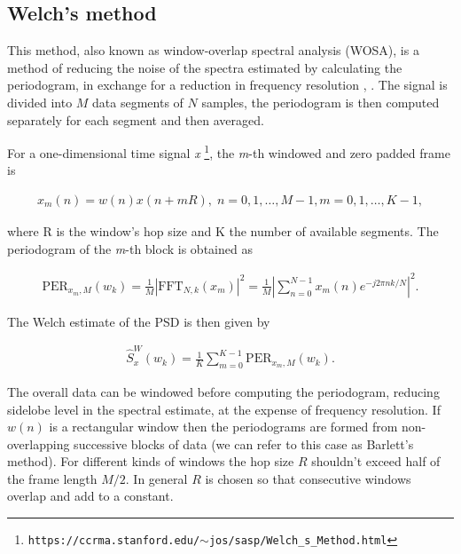 	
	\subsection{Welch's method}
	
	This method, also known as window-overlap spectral analysis (WOSA), is a method of reducing the noise of the spectra estimated by calculating the periodogram, in exchange for a reduction in frequency resolution \cite{Welch_period}, \cite{Spagnolini_ch14}.
	The signal is divided into $M$ data segments of $N$ samples, the periodogram is then computed separately for each segment and then averaged.
	
	For a one-dimensional time signal \textit{x} \cite{SASPWEB2011}\footnote{\texttt{https://ccrma.stanford.edu/$\sim$jos/sasp/Welch\_s\_Method.html}}, the \textit{m}-th windowed and zero padded frame is
	
	\begin{align}
		x_m(n) = w(n)x(n + mR), \; n=0,1,\ldots, M-1, m=0,1,\ldots, K-1,
	\end{align}
	
	where R is the window's hop size and K the number of available segments. The periodogram of the \textit{m}-th block is obtained as
	
	\begin{align}
		\text{PER}_{x_m,M}(w_k) = \frac{1}{M} |\text{FFT}_{N,k}(x_m)|^2 = \frac{1}{M}\left|\sum_{n=0}^{N-1}x_m(n)e^{-j2\pi nk/N}\right|^2.
	\end{align}
	
	The Welch estimate of the PSD is then given by
	
	\begin{align}
		\hat{S}^W_x(w_k) = \frac{1}{K}\sum_{m=0}^{K-1}\text{PER}_{x_m,M}(w_k).
	\end{align}
	
	The overall data can be windowed before computing the periodogram, reducing sidelobe level in the spectral estimate, at the expense of frequency resolution. If $w(n)$ is a rectangular window then the periodograms are formed from non-overlapping successive blocks of data (we can refer to this case as Barlett's method). For different kinds of windows the hop size $R$ shouldn't exceed half of the frame length $M/2$. In general $R$ is chosen so that consecutive windows overlap and add to a constant.
	
	
	

	

    
    
    